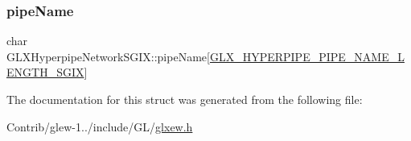 \subsubsection{\texorpdfstring{pipe\+Name}{pipeName}}
{\footnotesize\ttfamily char G\+L\+X\+Hyperpipe\+Network\+S\+G\+I\+X\+::pipe\+Name\mbox{[}\mbox{\hyperlink{glxew_8h_ae1c8261c0861010d8003a31d07e26005}{G\+L\+X\+\_\+\+H\+Y\+P\+E\+R\+P\+I\+P\+E\+\_\+\+P\+I\+P\+E\+\_\+\+N\+A\+M\+E\+\_\+\+L\+E\+N\+G\+T\+H\+\_\+\+S\+G\+IX}}\mbox{]}}



The documentation for this struct was generated from the following file\+:\begin{DoxyCompactItemize}
\item 
Contrib/glew-\/1../include/\+G\+L/\mbox{\hyperlink{glxew_8h}{glxew.\+h}}\end{DoxyCompactItemize}
